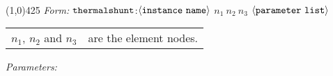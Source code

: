 \documentclass{article}
\begin{document}
\\
\hrulefill\linethickness{0.5mm}\line(1,0){425}
\normalsize
\newline
\textit{Form:}
$\tt thermalshunt$:$\langle \tt{instance\ name}\rangle$ $n_1\ n_2\
n_3$ $\langle \tt{parameter\ list}\rangle$
\newline
\begin{tabular}{r l}
$n_1$, $n_2$ and $n_3$ & are the element nodes. \\
\end{tabular}
\newline
\textit{Parameters:}
\end{document}
